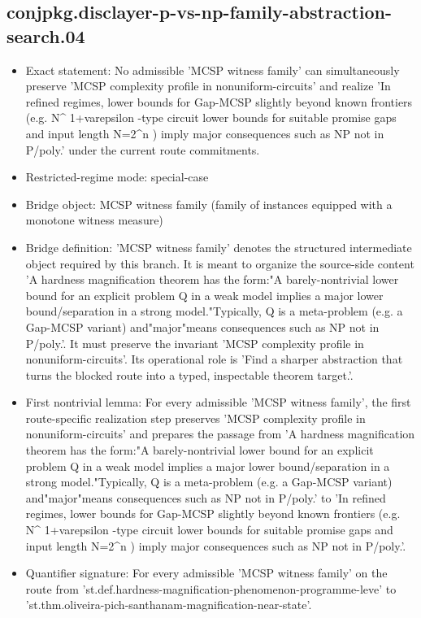 \documentclass[11pt]{article}
\begin{document}
\subsection*{conjpkg.disclayer-p-vs-np-family-abstraction-search.04}
\begin{itemize}
\item Exact statement: No admissible 'MCSP witness family' can simultaneously preserve 'MCSP complexity profile in nonuniform-circuits' and realize 'In refined regimes, lower bounds for Gap-MCSP slightly beyond known frontiers (e.g. N\textasciicircum{} 1+varepsilon -type circuit lower bounds for suitable promise gaps and input length N=2\textasciicircum{}n ) imply major consequences such as NP not in P/poly.' under the current route commitments.
\item Restricted-regime mode: special-case
\item Bridge object: MCSP witness family (family of instances equipped with a monotone witness measure)
\item Bridge definition: 'MCSP witness family' denotes the structured intermediate object required by this branch. It is meant to organize the source-side content 'A hardness magnification theorem has the form:"A barely-nontrivial lower bound for an explicit problem Q in a weak model implies a major lower bound/separation in a strong model."Typically, Q is a meta-problem (e.g. a Gap-MCSP variant) and"major"means consequences such as NP not in P/poly.'. It must preserve the invariant 'MCSP complexity profile in nonuniform-circuits'. Its operational role is 'Find a sharper abstraction that turns the blocked route into a typed, inspectable theorem target.'.
\item First nontrivial lemma: For every admissible 'MCSP witness family', the first route-specific realization step preserves 'MCSP complexity profile in nonuniform-circuits' and prepares the passage from 'A hardness magnification theorem has the form:"A barely-nontrivial lower bound for an explicit problem Q in a weak model implies a major lower bound/separation in a strong model."Typically, Q is a meta-problem (e.g. a Gap-MCSP variant) and"major"means consequences such as NP not in P/poly.' to 'In refined regimes, lower bounds for Gap-MCSP slightly beyond known frontiers (e.g. N\textasciicircum{} 1+varepsilon -type circuit lower bounds for suitable promise gaps and input length N=2\textasciicircum{}n ) imply major consequences such as NP not in P/poly.'.
\item Quantifier signature: For every admissible 'MCSP witness family' on the route from 'st.def.hardness-magnification-phenomenon-programme-leve' to 'st.thm.oliveira-pich-santhanam-magnification-near-state'.

\end{itemize}
\end{document}
